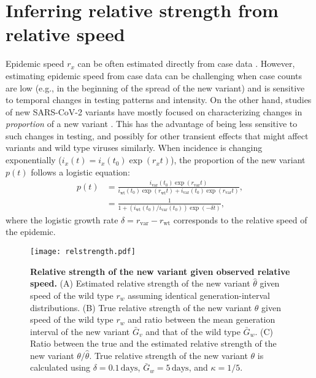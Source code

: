 \documentclass[12pt]{article}
\newcommand{\rx}[1]{\ensuremath{{r}_{#1}}\xspace}
\newcommand{\ry}[1]{\rx{\mathrm{#1}}}
\newcommand{\ix}[1]{\ensuremath{{i}_{#1}}\xspace}
\newcommand{\iy}[1]{\ix{\mathrm{#1}}}
\begin{document}
\section{Inferring relative strength from relative speed}

Epidemic speed $r_x$ can be often estimated directly from case data \citep{mills2004transmissibility,nishiura2009transmission,ma2014estimating}.
However, estimating epidemic speed from case data can be challenging when case counts are low (e.g., in the beginning of the spread of the new variant) and is sensitive to temporal changes in testing patterns and intensity.
On the other hand, studies of new SARS-CoV-2 variants have mostly focused on characterizing changes in \emph{proportion} of a new variant \citep{switzerland2021variant, davies2021estimated, di2021impact, leung2021early, volz2021transmission,zhao2021}.
This has the advantage of being less sensitive to such changes in testing, and possibly for other transient effects that might affect variants and wild type viruses similarly.
When incidence is changing exponentially ($i_x(t) = i_x(t_0) \exp(r_x t)$), the proportion of the new variant $p(t)$ follows a logistic equation:
\begin{align}
p(t) &= \frac{\iy{var}(t_0) \exp(\ry{var} t)}{\iy{wt}(t_0) \exp(\ry{wt} t) + \iy{var}(t_0) \exp(\ry{var} t)},
\\ &= \frac{1}{1 + \left(\iy{wt}(t_0)/\iy{var}(t_0)\right) \exp(-\delta t)},
\end{align}
where the logistic growth rate $\delta = \ry{var} - \ry{wt}$ corresponds to the relative speed of the epidemic.

\begin{figure}[!th]
\texttt{[image: relstrength.pdf]}
\caption{
\textbf{Relative strength of the new variant given observed relative speed.}
(A) Estimated relative strength of the new variant $\hat{\theta}$ given speed of the wild type
$r_w$ assuming identical generation-interval distributions.
(B) True relative strength of the new variant $\theta$ given speed of the wild type $r_w$ and ratio between the mean generation interval of the new variant $\bar{G}_v$ and that of the wild type $\bar{G}_w$.
(C) Ratio between the true and the estimated relative strength of the new variant $\theta/\hat{\theta}$.
True relative strength of the new variant $\theta$ is calculated using $\delta=0.1\,\textrm{days}$, $\bar{G}_w = 5\,\textrm{days}$, and $\kappa = 1/5$.
}
\label{fig:relstrength}
\end{figure}
\end{document}
